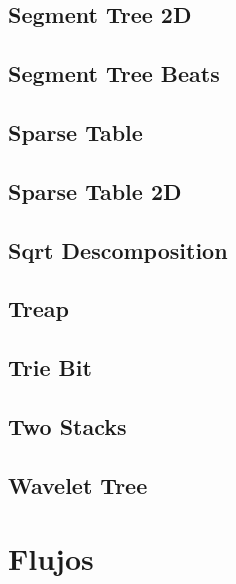 \subsection{Segment Tree 2D}
\raggedbottom
\hrulefill
\subsection{Segment Tree Beats}
\raggedbottom
\hrulefill
\subsection{Sparse Table}
\raggedbottom
\hrulefill
\subsection{Sparse Table 2D}
\raggedbottom
\hrulefill
\subsection{Sqrt Descomposition}
\raggedbottom
\hrulefill
\subsection{Treap}
\raggedbottom
\hrulefill
\subsection{Trie Bit}
\raggedbottom
\hrulefill
\subsection{Two Stacks}
\raggedbottom
\hrulefill
\subsection{Wavelet Tree}
\raggedbottom
\hrulefill

\section{Flujos}
